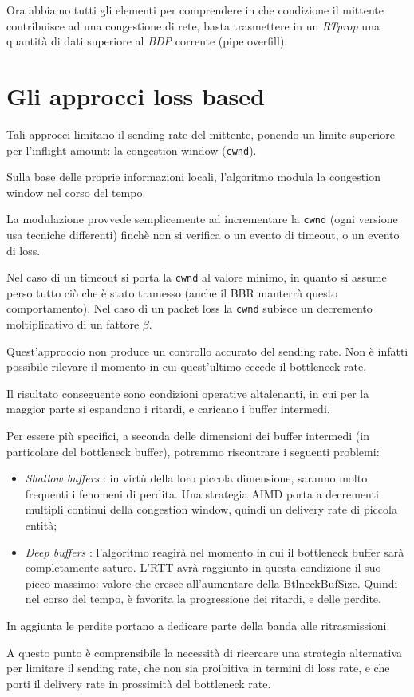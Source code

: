 Ora abbiamo tutti gli elementi per comprendere in che condizione il mittente contribuisce ad una congestione di rete, basta trasmettere in un \textit{RTprop} una quantità di dati superiore al \textit{BDP} corrente (pipe overfill). \bigskip

\section{Gli approcci loss based}

Tali approcci limitano il sending rate del mittente, ponendo un limite superiore per l'inflight amount: la congestion window (\texttt{cwnd}). \bigskip

Sulla base delle proprie informazioni locali, l'algoritmo modula la congestion window nel corso del tempo. \bigskip

La modulazione provvede semplicemente ad incrementare la \texttt{cwnd} (ogni versione usa tecniche differenti) finchè non si verifica o un evento di timeout, o un evento di loss. \bigskip

Nel caso di un timeout si porta la \texttt{cwnd} al valore minimo, in quanto si assume perso tutto ciò che è stato tramesso (anche il BBR manterrà questo comportamento).
Nel caso di un packet loss la \texttt{cwnd} subisce un decremento moltiplicativo di un fattore $ \beta $. \bigskip

Quest'approccio non produce un controllo accurato del sending rate. Non è infatti possibile rilevare il momento in cui quest'ultimo eccede il bottleneck rate. \bigskip

Il risultato conseguente sono condizioni operative altalenanti, in cui per la maggior parte si espandono i ritardi, e caricano i buffer intermedi. \bigskip

Per essere più specifici, a seconda delle dimensioni dei buffer intermedi (in particolare del bottleneck buffer), potremmo riscontrare i seguenti problemi:

\begin{itemize}

\item \textit{Shallow buffers} : in virtù della loro piccola dimensione, saranno molto frequenti i fenomeni di perdita. Una strategia AIMD porta a decrementi multipli continui della congestion window, quindi un delivery rate di piccola entità;

\item \textit{Deep buffers} : l'algoritmo reagirà nel momento in cui il bottleneck buffer sarà completamente saturo. L'RTT avrà raggiunto in questa condizione il suo picco massimo: valore che cresce all'aumentare della BtlneckBufSize. 
Quindi nel corso del tempo, è favorita la progressione dei ritardi, e delle perdite.

\end{itemize}

In aggiunta le perdite portano a dedicare parte della banda alle ritrasmissioni. \bigskip

A questo punto è comprensibile la necessità di ricercare una strategia alternativa per limitare il sending rate, che non sia proibitiva in termini di loss rate, e che porti il delivery rate in prossimità del bottleneck rate.
